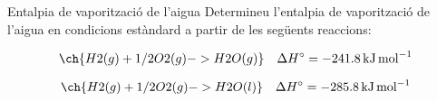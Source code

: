\begin{exr}{Entalpia de vaporització de l'aigua}
    Determineu l'entalpia de vaporització de l'aigua en condicions estàndard a partir de les següents reaccions:

\[
\ch{H2(g) + 1/2 O2(g) -> H2O(g)} \quad \Delta H^\circ = \qty{-241.8}{\kilo\joule\per\mol}
\]

\[
\ch{H2(g) + 1/2 O2(g) -> H2O(l)} \quad \Delta H^\circ = \qty{-285.8}{\kilo\joule\per\mol}
\]
\end{exr}

